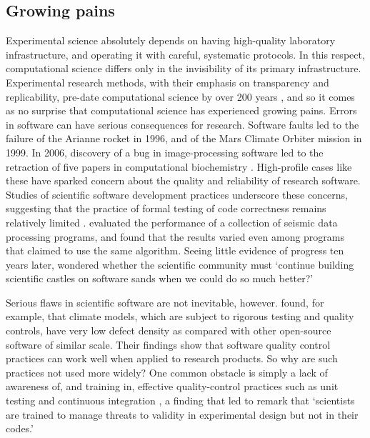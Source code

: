 \documentclass{article} %
\begin{document}
\subsection{Growing pains}

Experimental science absolutely depends on having high-quality laboratory infrastructure, and operating it with careful, systematic protocols. In this respect, computational science differs only in the invisibility of its primary infrastructure. Experimental research methods, with their emphasis on transparency and replicability, pre-date computational science by over 200 years \citep{wilson2006s,fomel2009reproducible}, and so it comes as no surprise that computational science has experienced growing pains. Errors in software can have serious consequences for research. Software faults led to the failure of the Arianne rocket in 1996, and of the Mars Climate Orbiter mission in 1999. In 2006, discovery of a bug in image-processing software led to the retraction of five papers in computational biochemistry \citep{miller2006scientist}. High-profile cases like these have sparked concern about the quality and reliability of research software. Studies of scientific software development practices underscore these concerns, suggesting that the practice of formal testing of code correctness remains relatively limited \citep{post2005computational,wilson2006s,hannay2009scientists,nguyen2010survey,clune2011software,howison2011scientific,prabhu2011survey,kanewala2014testing,heaton2015claims}. \citet{hatton1997t} evaluated the performance of a collection of seismic data processing programs, and found that the results varied even among programs that claimed to use the same algorithm. Seeing little evidence of progress ten years later, \citet{hatton2007chimera} wondered whether the scientific community must `continue building scientific castles on software sands when we could do so much better?'

Serious flaws in scientific software are not inevitable, however. \citet{pipitone2012assessing} found, for example, that climate models, which are subject to rigorous testing and quality controls, have very low defect density as compared with other open-source software of similar scale. Their findings show that software quality control practices can work well when applied to research products. So why are such practices not used more widely? One common obstacle is simply a lack of awareness of, and training in, effective quality-control practices such as unit testing and continuous integration \citep{wilson2006s,faulk2009scientific,hannay2009scientists,kanewala2014testing}, a finding that led \citet{faulk2009scientific} to remark that `scientists are trained to manage threats to validity in experimental design but not in their codes.'
\end{document}
